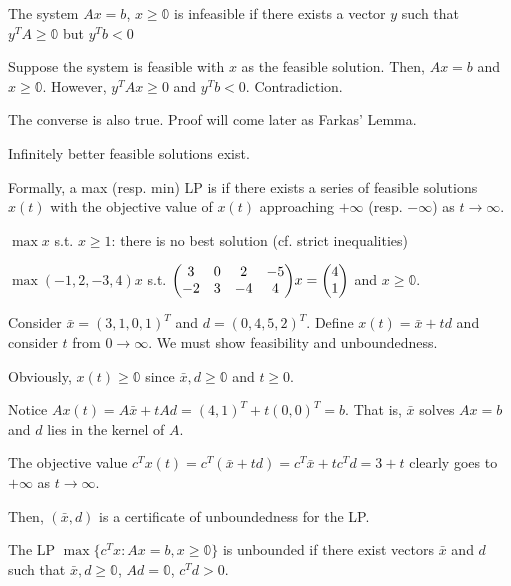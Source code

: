 \begin{prop}
  The system $Ax = b$, $x \geq \mathbb{0}$ is infeasible if there exists a vector $y$ such that $y^T A \geq \mathbb{0}$ but $y^T b < 0$
\end{prop}
\begin{prf}
  Suppose the system is feasible with $x$ as the feasible solution. Then, $Ax = b$ and $x \geq \mathbb{0}$. However, $y^T A x \geq 0$ and $y^T b < 0$. Contradiction.
\end{prf}

The converse is also true. Proof will come later as Farkas' Lemma.

\begin{defn}[unboundedness]
  Infinitely better feasible solutions exist.

  Formally, a max (resp. min) LP is  if there exists a series of feasible solutions $x(t)$ with the objective value of $x(t)$ approaching $+\infty$ (resp. $-\infty$) as $t \to \infty$.
\end{defn}
\begin{example}
  $\max x$ s.t. $x \geq 1$: there is no best solution (cf. strict inequalities)
\end{example}
\begin{example}
  $\max{} (-1,2,-3,4)x$ s.t. $\mqty(3&0&2&-5\\-2&3&-4&4)x=\mqty(4\\1)$ and $x \geq \mathbb 0$.

  Consider $\bar x = (3,1,0,1)^T$ and $d = (0,4,5,2)^T$. Define $x(t) = \bar x + td$ and consider $t$ from $0 \to \infty$.
  We must show feasibility and unboundedness.

  Obviously, $x(t) \geq \mathbb 0$ since $\bar x, d \geq \mathbb 0$ and $t \geq 0$.

  Notice $Ax(t) = A\bar x + tAd = (4,1)^T + t(0,0)^T = b$. That is, $\bar x$ solves $Ax = b$ and $d$ lies in the kernel of $A$.

  The objective value $c^T x(t) = c^T(\bar x + td) = c^T\bar x + tc^T d = 3 + t$ clearly goes to $+\infty$ as $t \to \infty$.

  Then, $(\bar x, d)$ is a certificate of unboundedness for the LP.
\end{example}

\begin{prop}
  The LP $\max \{c^T x : Ax=b, x \geq \mathbb 0\}$ is unbounded if there exist vectors $\bar x$ and $d$ such that $\bar x, d \geq \mathbb 0$, $Ad = \mathbb 0$, $c^T d > 0$.
\end{prop}
